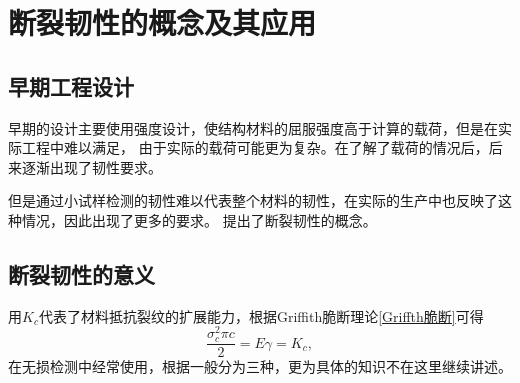     \section{断裂韧性的概念及其应用}
        \subsection{早期工程设计}
            早期的设计主要使用强度设计，使结构材料的屈服强度高于计算的载荷，但是在实际工程中难以满足，
            由于实际的载荷可能更为复杂。在了解了载荷的情况后，后来逐渐出现了韧性要求。

            但是通过小试样检测的韧性难以代表整个材料的韧性，在实际的生产中也反映了这种情况，因此出现了更多的要求。
            提出了断裂韧性的概念。
        \subsection{断裂韧性的意义}
            用$K_c$代表了材料抵抗裂纹的扩展能力，根据Griffith脆断理论\autoref{Griffth脆断}可得
            \begin{equation}
                \frac{\sigma_c^2 \pi c}{2}=E\gamma=K_c,
            \end{equation}
            在无损检测中经常使用，根据一般分为三种，更为具体的知识不在这里继续讲述。
            